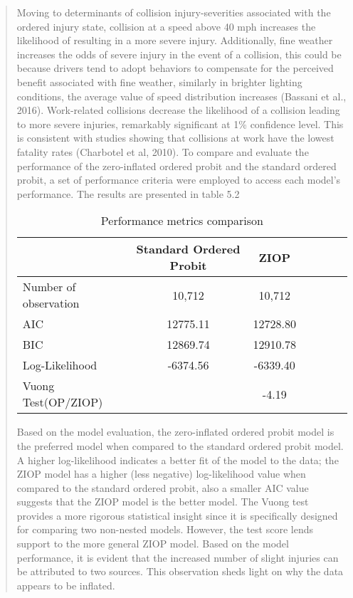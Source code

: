 \documentclass[12]{report}
\begin{document}
\begin{quote}
{Moving to determinants of collision injury-severities associated with the ordered injury state, collision at a speed above 40 mph increases the likelihood of resulting in a more severe injury. Additionally, fine weather increases the odds of severe injury in the event of a collision, this could be because drivers tend to adopt behaviors to compensate for the perceived benefit associated with fine weather, similarly in brighter lighting conditions, the average value of speed distribution increases (Bassani et al., 2016).  Work-related collisions decrease the likelihood of a collision leading to more severe injuries, remarkably significant at 1\% confidence level. This is consistent with studies showing that collisions at work have the lowest fatality rates (Charbotel et al, 2010). To compare and evaluate the performance of the zero-inflated ordered probit and the standard ordered probit, a set of performance criteria were employed to access each model's performance. The results are presented in table 5.2

\begin{table}[H]
\renewcommand{\arraystretch}{1.3}
\centering
\begin{tabular}{p{8cm} ccc ccc}
\toprule
 & \textbf{Standard Ordered Probit} & \textbf{ZIOP} \\
\hline
Number of observation & 10,712 & 10,712 \\
AIC & 12775.11 & 12728.80 \\
BIC & 12869.74 & 12910.78 \\
Log-Likelihood & -6374.56 & -6339.40 \\
Vuong Test(OP/ZIOP) & &  -4.19 \\
\hline
\end{tabular}
\caption{Performance metrics comparison}
\end{table}

Based on the model evaluation, the zero-inflated ordered probit model is the preferred model when compared to the standard ordered probit model. A higher log-likelihood indicates a better fit of the model to the data; the ZIOP model has a higher (less negative) log-likelihood value when compared to the standard ordered probit, also a smaller AIC value suggests that the ZIOP model is the better model. The Vuong test provides a more rigorous statistical insight since it is specifically designed for comparing two non-nested models. However, the test score lends support to the more general ZIOP model. Based on the model performance, it is evident that the increased number of slight injuries can be attributed to two sources. This observation sheds light on why the data appears to be inflated.

}
\end{quote}
\end{document}
